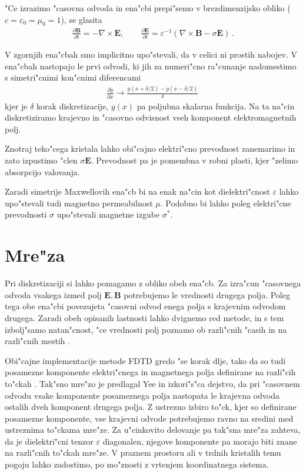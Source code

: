 \documentclass[12pt,twoside,openright,final]{report}
\newcommand{\odvod}[2]{\frac{\partial #1}{\partial #2}}
\renewcommand{\vec}{\mathbf}
\newcommand{\eps}{\varepsilon}
\begin{document}
"Ce izrazimo "casovna odvoda in ena"cbi prepi"semo v brezdimenzijsko obliko ($c = \varepsilon_0 = \mu_0 = 1$), se glasita
\begin{align}
\label{eq:maxwell-base}
 \odvod{\vec{B}}{t} = -\nabla \times \vec{E}, \qquad \odvod{\vec{E}}{t} = \eps^{-1} (\nabla \times \vec{B} - \sigma \vec E)\,.
\end{align}

V zgornjih ena"cbah smo implicitno upo"stevali, da v celici ni prostih nabojev.
V ena"cbah nastopajo le prvi odvodi, ki jih za numeri"cno ra"cunanje nadomestimo s simetri"cnimi kon"cnimi diferencami
\begin{align}
 \frac{\partial y}{\partial x} \rightarrow \frac{y(x+\delta/2) - y(x-\delta/2)}{\delta}\,
\end{align}
kjer je $\delta$ korak diskretizacije, $y(x)$ pa poljubna skalarna funkcija. 
Na ta na"cin diskretiziramo krajevno in "casovno odvisnost vseh komponent elektromagnetnih polj. 

Znotraj teko"cega kristala lahko obi"cajno elektri"cno prevodnost zanemarimo in zato izpustimo "clen $\sigma \vec E$. 
Prevodnost pa je pomembna v robni plasti, kjer "zelimo absorpcijo valovanja. 

Zaradi simetrije Maxwellovih ena"cb bi na enak na"cin kot dielektri"cnost $\varepsilon$ lahko upo"stevali tudi magnetno permeabilnost $\mu$. 
Podobno bi lahko poleg elektri"cne prevodnosti $\sigma$ upo"stevali magnetne izgube $\sigma^\ast$. 

\section{Mre"za}

Pri diskretizaciji si lahko pomagamo z obliko obeh ena"cb. 
Za izra"cun "casovnega odvoda vsakega izmed polj $\vec{E}, \vec{B}$ potrebujemo le vrednosti drugega polja. 
Poleg tega obe ena"cbi povezujeta "casovni odvod enega polja s krajevnim odvodom drugega. 
Zaradi obeh opisanih lastnosti lahko dvignemo red metode, in s tem izbolj"samo natan"cnost, "ce vrednosti polj poznamo ob razli"cnih "casih in na razli"cnih mestih \cite{taflove}. 

Obi"cajne implementacije metode \acs{FDTD} gredo "se korak dlje, tako da so tudi posamezne komponente elektri"cnega in magnetnega polja definirane na razli"cih to"ckah \cite{yee, yee-lattice}.
Tak"sno mre"zo je predlagal Yee in izkori"s"ca dejstvo, da pri "casovnem odvodu vsake komponente posameznega polja nastopata le krajevna odvoda ostalih dveh komponent drugega polja. 
Z ustrezno izbiro to"ck, kjer so definirane posamezne komponente, vse krajevni odvode potrebujemo ravno na sredini med ustreznima to"ckama mre"ze. 
Za u"cinkovito delovanje pa tak"sna mre"za zahteva, da je dielektri"cni tenzor $\eps$ diagonalen, njegove komponente pa morajo biti znane na razli"cnih to"ckah mre"ze. 
V praznem prostoru ali v trdnih kristalih temu pogoju lahko zadostimo, po mo"znosti z vrtenjem koordinatnega sistema.
\end{document}

